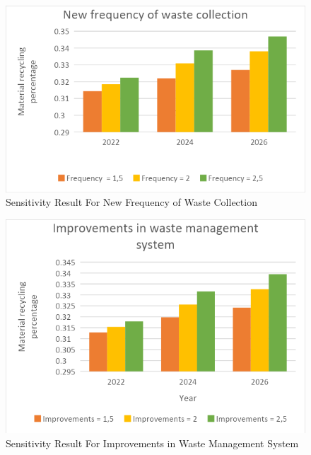 \begin{figure}[H]
\centering
\includegraphics [scale=0.40,angle=360]{figures/sensitivitynewf.png}
\caption{Sensitivity Result For New Frequency of Waste Collection}
\label{fig:sensitivitynewf}
\end{figure}

\begin{figure}[H]
\centering
\includegraphics [scale=0.40,angle=360]{figures/sensitivityi.png}
\caption{Sensitivity Result For Improvements in Waste Management System}
\label{fig:sensitivityi}
\end{figure}